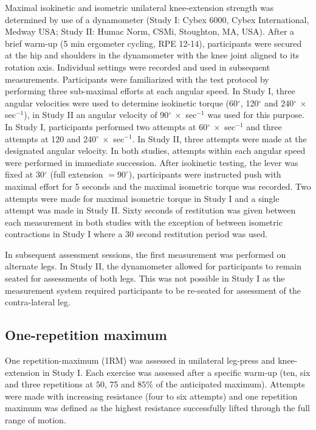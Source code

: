 \documentclass[twoside,10pt]{gihclass} %
\begin{document}
Maximal isokinetic and isometric unilateral knee-extension strength was determined by use of a dynamometer (Study I: Cybex 6000, Cybex International, Medway USA; Study II: Humac Norm, CSMi, Stoughton, MA, USA).
After a brief warm-up (5 min ergometer cycling, RPE 12-14), participants were secured at the hip and shoulders in the dynamometer with the knee joint aligned to its rotation axis.
Individual settings were recorded and used in subsequent measurements.
Participants were familiarized with the test protocol by performing three sub-maximal efforts at each angular speed.
In Study I, three angular velocities were used to determine isokinetic torque (60\(^{\circ}\), 120\(^{\circ}\) and 240\(^{\circ} ~\times\) sec\(^{-1}\)), in Study II an angular velocity of 90\(^{\circ} ~\times\) sec\(^{-1}\) was used for this purpose.
In Study I, participants performed two attempts at 60\(^{\circ} ~\times\) sec\(^{-1}\) and three attempts at 120 and 240\(^{\circ}~\times\) sec\(^{-1}\).
In Study II, three attempts were made at the designated angular velocity.
In both studies, attempts within each angular speed were performed in immediate succession.
After isokinetic testing, the lever was fixed at 30\(^{\circ}\) (full extension \(=90^{\circ}\)), participants were instructed push with maximal effort for 5 seconds and the maximal isometric torque was recorded.
Two attempts were made for maximal isometric torque in Study I and a single attempt was made in Study II.
Sixty seconds of restitution was given between each measurement in both studies with the exception of between isometric contractions in Study I where a 30 second restitution period was used.

In subsequent assessment sessions, the first measurement was performed on alternate legs.
In Study II, the dynamometer allowed for participants to remain seated for assessments of both legs. This was not possible in Study I as the measurement system required participants to be re-seated for assessment of the contra-lateral leg.

\hypertarget{one-repetition-maximum}{%
\subsection{One-repetition maximum}\label{one-repetition-maximum}}

One repetition-maximum (1RM) was assessed in unilateral leg-press and knee-extension in Study I.
Each exercise was assessed after a specific warm-up (ten, six and three repetitions at \(50\), 75 and \(85\%\) of the anticipated maximum). Attempts were made with increasing resistance (four to six attempts) and one repetition maximum was defined as the highest resistance successfully lifted through the full range of motion.
\end{document}
